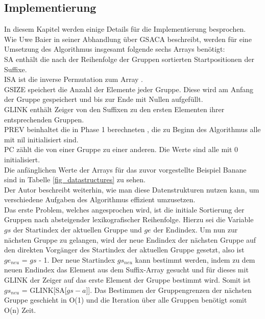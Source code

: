 \newpage
\subsection{Implementierung}
\label{gsaca:chapter5}
%
In diesem Kapitel werden einige Details für die Implementierung besprochen. \\

Wie Uwe Baier in seiner Abhandlung über GSACA beschreibt, werden für eine Umsetzung des Algorithmus insgesamt folgende sechs Arrays benötigt:\\
SA enthält die nach der Reihenfolge der Gruppen sortierten Startpositionen der Suffixe. \\
ISA ist die inverse Permutation zum Array \sa. \\
GSIZE speichert die Anzahl der Elemente jeder Gruppe. 
Diese wird am Anfang der Gruppe gespeichert und bis zur Ende mit Nullen aufgefüllt.\\
GLINK enthält Zeiger von den Suffixen zu den ersten Elementen ihrer entsprechenden Gruppen. \\
PREV beinhaltet die in Phase 1 berechneten \prevpointer, die zu Beginn des Algorithmus alle mit nil initialisiert sind.\\
PC zählt die \prevpointer von einer Gruppe zu einer anderen. 
Die Werte sind alle mit 0 initialisiert.\\
Die anfänglichen Werte der Arrays für das zuvor vorgestellte Beispiel Banane sind in Tabelle \ref{fig_datastructures} zu sehen.\\



Der Autor beschreibt weiterhin, wie man diese Datenstrukturen nutzen kann, um verschiedene Aufgaben des Algorithmus effizient umzusetzen.\\

Das erste Problem, welches angesprochen wird, ist die initiale Sortierung der Gruppen nach absteigender lexikografischer Reihenfolge. 
Hierzu sei die Variable $gs$ der Startindex der aktuellen Gruppe und $ge$ der Endindex. 
Um nun zur nächsten Gruppe zu gelangen, wird der neue Endindex der nächsten Gruppe auf den direkten Vorgänger des Startindex der aktuellen Gruppe gesetzt, also ist $ge_{neu}$ = $gs$ - 1. 
Der neue Startindex $gs_{neu}$ kann bestimmt werden, indem zu dem neuen Endindex das Element aus dem Suffix-Array \sa gesucht und für dieses mit GLINK der Zeiger auf das erste Element der Gruppe bestimmt wird. 
Somit ist $gs_{neu}$ = GLINK[SA[$gs - a$]]. 
Das Bestimmen der Gruppengrenzen der nächsten Gruppe geschieht in O(1) und die Iteration über alle Gruppen benötigt somit O(n) Zeit.\\

